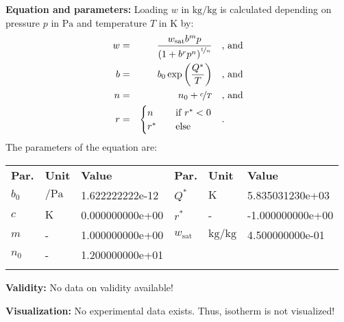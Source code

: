 \textbf{Equation and parameters:}
\newline
%
Loading $w$ in $\si{\kilogram\per\kilogram}$ is calculated depending on pressure $p$ in $\si{\pascal}$ and temperature $T$ in $\si{\kelvin}$ by:
%
\begin{equation*}
\begin{split}
w &=& \frac{w_\mathrm{sat} b^{m} p}{\left( 1 + b^{r} p^{n} \right)^{\nicefrac{1}{n}}} & \quad\text{, and} \\
b &=& b_0 \exp\left( \frac{Q^{*}}{T} \right) & \quad\text{, and} \\
n &=& n_0 + \nicefrac{c}{T} & \quad\text{, and} \\
r &=& \begin{cases} n & \quad \text{if } r^{*} < 0 \\ r^{*}  & \quad \text{else} \end{cases} & \quad\text{.}
\end{split}
\end{equation*}
%
The parameters of the equation are:
%
\begin{longtable}[l]{lll|lll}
\toprule
\addlinespace
\textbf{Par.} & \textbf{Unit} & \textbf{Value} &	\textbf{Par.} & \textbf{Unit} & \textbf{Value} \\
\addlinespace
\midrule
\endhead

\bottomrule
\endfoot
\bottomrule
\endlastfoot
\addlinespace

$b_0$ & $\si{\per\pascal}$ & 1.622222222e-12 & $Q^{*}$ & $\si{\kelvin}$ & 5.835031230e+03 \\
$c$ & $\si{\kelvin}$ & 0.000000000e+00 & $r^{*}$ & - & -1.000000000e+00 \\
$m$ & - & 1.000000000e+00 & $w_\mathrm{sat}$ & $\si{\kilogram\per\kilogram}$ & 4.500000000e-01 \\
$n_0$ & - & 1.200000000e+01 & & & \\

\addlinespace\end{longtable}

\textbf{Validity:}
\newline
No data on validity available!
\newline

\textbf{Visualization:}
%
\newline
No experimental data exists. Thus, isotherm is not visualized!
%

\FloatBarrier
\newpage
